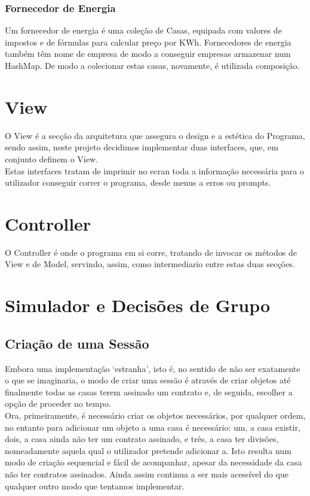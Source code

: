 \documentclass[10pt, a4paper]{article}
\begin{document}
\subsubsection{Fornecedor de Energia}
        Um fornecedor de energia é uma coleção de Casas, equipada com valores de impostos e de fórmulas para calcular preço por KWh.\@ 
        Fornecedores de energia também têm nome de empresa de modo a conseguir empresas armazenar num HashMap.
        De modo a colecionar estas casas, novamente, é utilizada composição.
\section{View}
        O View é a secção da arquitetura que assegura o design e a estética do Programa, sendo assim, neste projeto decidimos implementar duas interfaces, que,
        em conjunto definem o View. \\
        Estas interfaces tratam de imprimir no ecran toda a informação necessária para o utilizador conseguir correr o programa, desde menus a erros ou prompts.
\section{Controller}
        O Controller é onde o programa em si corre, tratando de invocar os métodos de View e de Model, servindo, assim, como intermediario entre estas duas secções.
\section{Simulador e Decisões de Grupo}
\subsection{Criação de uma Sessão}
        Embora uma implementação `estranha', isto é, no sentido de não ser exatamente o que se imaginaria, o modo de criar uma sessão é
        através de criar objetos até finalmente todas as casas terem assinado um contrato e, de seguida, escolher a opção de proceder no tempo. \\
        Ora, primeiramente, é necessário criar os objetos necessários, por qualquer ordem, no entanto para adicionar um objeto a uma casa é necessário: um,
        a casa existir, dois, a casa ainda não ter um contrato assinado, e três, a casa ter divisões, nomeadamente aquela qual o utilizador pretende adicionar a.\@
        Isto resulta num modo de criação sequencial e fácil de acompanhar, apesar da necessidade da casa não ter contratos assinados. \@ Ainda assim continua a ser mais acessível
        do que qualquer outro modo que tentamos implementar.
\end{document}
